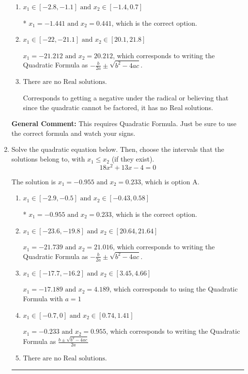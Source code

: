 \documentclass{extbook}[14pt]
\newcommand{\litem}[1]{\item #1

\rule{\textwidth}{0.4pt}}
\begin{document}
\begin{enumerate}
{\begin{enumerate}[label=\Alph*.]
 $x_1 = -4.856 \text{ and } x_2 = 15.856$, which corresponds to using the Quadratic Formula with $a=1$
\item \( x_1 \in [-2.8, -1.1] \text{ and } x_2 \in [-1.4, 0.7] \)

* $x_1 = -1.441 \text{ and } x_2 = 0.441$, which is the correct option.
\item \( x_1 \in [-22, -21.1] \text{ and } x_2 \in [20.1, 21.8] \)

 $x_1 = -21.212 \text{ and } x_2 = 20.212$, which corresponds to writing the Quadratic Formula as $-\frac{b}{2a} \pm \sqrt{b^2 - 4ac}$.
\item \( \text{There are no Real solutions.} \)

Corresponds to getting a negative under the radical or believing that since the quadratic cannot be factored, it has no Real solutions.
\end{enumerate}

\textbf{General Comment:} This requires Quadratic Formula. Just be sure to use the correct formula and watch your signs.
}
\litem{
Solve the quadratic equation below. Then, choose the intervals that the solutions belong to, with $x_1 \leq x_2$ (if they exist).
\[ 18x^{2} +13 x -4 = 0 \]

The solution is \( x_1 = -0.955 \text{ and } x_2 = 0.233 \), which is option A.\begin{enumerate}[label=\Alph*.]
\item \( x_1 \in [-2.9, -0.5] \text{ and } x_2 \in [-0.43, 0.58] \)

* $x_1 = -0.955 \text{ and } x_2 = 0.233$, which is the correct option.
\item \( x_1 \in [-23.6, -19.8] \text{ and } x_2 \in [20.64, 21.64] \)

 $x_1 = -21.739 \text{ and } x_2 = 21.016$, which corresponds to writing the Quadratic Formula as $-\frac{b}{2a} \pm \sqrt{b^2 - 4ac}$.
\item \( x_1 \in [-17.7, -16.2] \text{ and } x_2 \in [3.45, 4.66] \)

 $x_1 = -17.189 \text{ and } x_2 = 4.189$, which corresponds to using the Quadratic Formula with $a=1$
\item \( x_1 \in [-0.7, 0] \text{ and } x_2 \in [0.74, 1.41] \)

 $x_1 = -0.233 \text{ and } x_2 = 0.955$, which corresponds to writing the Quadratic Formula as $\frac{b \pm \sqrt{b^2 - 4ac}}{2a}$
\item \( \text{There are no Real solutions.} \)


\end{enumerate}}
\end{enumerate}
\end{document}
